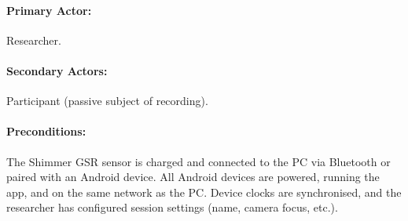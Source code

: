\paragraph{Primary Actor:} Researcher.

\paragraph{Secondary Actors:} Participant (passive subject of recording).

\paragraph{Preconditions:} The Shimmer GSR sensor is charged and connected to the PC via Bluetooth or paired with an Android device. All Android devices are powered, running the app, and on the same network as the PC. Device clocks are synchronised, and the researcher has configured session settings (name, camera focus, etc.).

